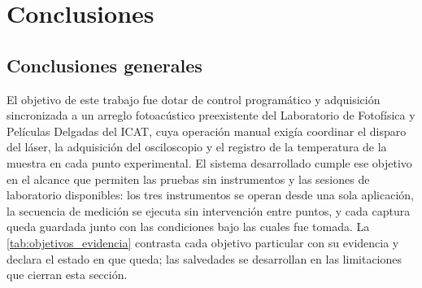 \chapter{Conclusiones}
\label{cap:conclusiones}

\section{Conclusiones generales}
\label{sec:conclusiones_generales}

El objetivo de este trabajo fue dotar de control programático y
adquisición sincronizada a un arreglo fotoacústico preexistente del
Laboratorio de Fotofísica y Películas Delgadas del ICAT, cuya operación
manual exigía coordinar el disparo del láser, la adquisición del
osciloscopio y el registro de la temperatura de la muestra en cada
punto experimental. El sistema desarrollado cumple ese objetivo en el
alcance que permiten las pruebas sin instrumentos y las sesiones de
laboratorio disponibles: los tres instrumentos se operan desde una sola
aplicación, la secuencia de medición se ejecuta sin intervención entre
puntos, y cada captura queda guardada junto con las condiciones bajo
las cuales fue tomada. La \cref{tab:objetivos_evidencia} contrasta cada
objetivo particular con su evidencia y declara el estado en que queda;
las salvedades se desarrollan en las limitaciones que cierran esta
sección.

